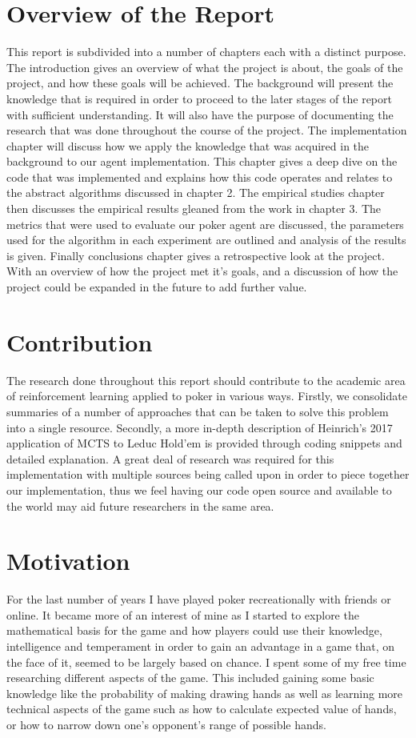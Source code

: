 \section{Overview of the Report}\label{sec:reportOverview}
This report is subdivided into a number of chapters each with a distinct purpose.
The introduction gives an overview of what the project is about, the goals of the project, and how
these goals will be achieved.
The background will present the knowledge that is required in order to proceed to the
later stages of the report with sufficient understanding.
It will also have the purpose of documenting the research that was done throughout the course of the project.
The implementation chapter will discuss how we apply the knowledge that was acquired in the
background to our agent implementation.
This chapter gives a deep dive on the code that was implemented and explains how this code operates
and relates to the abstract algorithms discussed in chapter 2.
The empirical studies chapter then discusses the empirical results gleaned from the work in chapter 3.
The metrics that were used to evaluate our poker agent are discussed, the parameters used for the algorithm
in each experiment are outlined and analysis of the results is given.
Finally conclusions chapter gives a retrospective look at the project.
With an overview of how the project met it's goals, and a discussion of how the project could be
expanded in the future to add further value.

\section{Contribution}\label{sec:contribution}
The research done throughout this report should contribute to the academic area of reinforcement
learning applied to poker in various ways.
Firstly, we consolidate summaries of a number of approaches that can be taken to solve this problem into a single
resource.
Secondly, a more in-depth description of Heinrich's 2017 application of MCTS to Leduc Hold'em is
provided through coding snippets and detailed explanation.
A great deal of research was required for this implementation with multiple sources being called
upon in order to piece together our implementation, thus we feel having our code
open source and available to the world may aid future researchers in the same area.

\section{Motivation}\label{sec:Motivation}
For the last number of years I have played poker recreationally with friends or online.
It became more of an interest of mine as I started to explore the mathematical basis for the game and how
players could use their knowledge, intelligence and temperament in order to gain an advantage in a game that,
on the face of it, seemed to be largely based on chance.
I spent some of my free time researching different aspects of the game.
This included gaining some basic knowledge like the probability of making drawing hands as well as learning more
technical aspects of the game such as how to calculate expected value of hands,
or how to narrow down one's opponent's range of possible hands.

